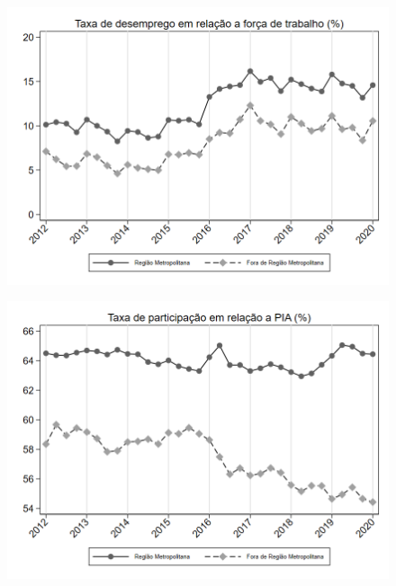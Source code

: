 \begin{frame}[label=_composicao_demografica_regiao_metro_taxa_de_desemprego]{}
\textit{\hyperlink{_composicao_demografica_regiao_metro}{}}
\begin{figure}
  \centering
  \includegraphics[width=1.0\linewidth]{../../analysis/output/composicao_demografica/area_geografica/_composicao_demografica_regiao_metro_taxa_de_desemprego.png}
  \caption{}
  \label{fig:_composicao_demografica_regiao_metro_taxa_de_desemprego}
\end{figure}
\end{frame}

\begin{frame}[label=_composicao_demografica_regiao_metro_taxa_de_participacao]{}
\textit{\hyperlink{_composicao_demografica_regiao_metro}{}}
\begin{figure}
  \centering
  \includegraphics[width=1.0\linewidth]{../../analysis/output/composicao_demografica/area_geografica/_composicao_demografica_regiao_metro_taxa_de_participacao.png}
  \caption{}
  \label{fig:_composicao_demografica_regiao_metro_taxa_de_participacao}
\end{figure}
\end{frame}

